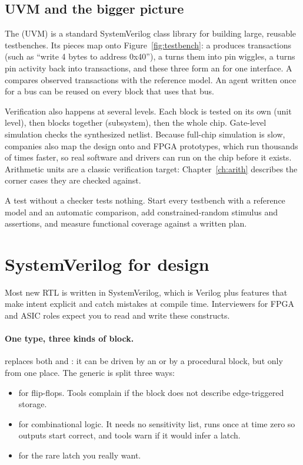\subsection*{UVM and the bigger picture}

The  (UVM) is a standard SystemVerilog class library for building large, reusable testbenches. Its pieces map onto Figure~\ref{fig:testbench}: a  produces transactions (such as ``write 4 bytes to address 0x40''), a  turns them into pin wiggles, a  turns pin activity back into transactions, and these three form an  for one interface. A  compares observed transactions with the reference model. An agent written once for a bus can be reused on every block that uses that bus.

Verification also happens at several levels. Each block is tested on its own (unit level), then blocks together (subsystem), then the whole chip. Gate-level simulation checks the synthesized netlist. Because full-chip simulation is slow, companies also map the design onto  and FPGA prototypes, which run thousands of times faster, so real software and drivers can run on the chip before it exists. Arithmetic units are a classic verification target: Chapter~\ref{ch:arith} describes the corner cases they are checked against.

\begin{remember}
A test without a checker tests nothing. Start every testbench with a reference model and an automatic comparison, add constrained-random stimulus and assertions, and measure functional coverage against a written plan.
\end{remember}

\section{SystemVerilog for design}
\label{sec:sv}

Most new RTL is written in SystemVerilog, which is Verilog plus features that make intent explicit and catch mistakes at compile time. Interviewers for FPGA and ASIC roles expect you to read and write these constructs.

\paragraph{One type, three kinds of block.}  replaces both  and : it can be driven by an  or by a procedural block, but only from one place. The generic  is split three ways:
\begin{itemize}
  \item {} for flip-flops. Tools complain if the block does not describe edge-triggered storage.
  \item {} for combinational logic. It needs no sensitivity list, runs once at time zero so outputs start correct, and tools warn if it would infer a latch.
  \item {} for the rare latch you really want.
\end{itemize}

